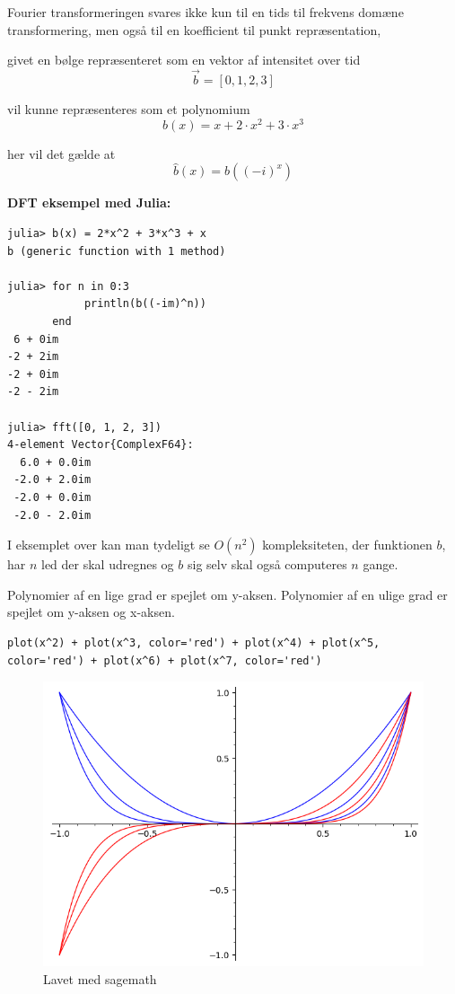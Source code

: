 \documentclass[11pt,a4paper]{article}
\begin{document}
Fourier transformeringen svares ikke kun til en tids til frekvens domæne transformering,
men også til en koefficient til punkt repræsentation,

givet en bølge repræsenteret som en vektor af intensitet over tid
$$
\vec{b} = [0, 1, 2, 3]
$$

vil kunne repræsenteres som et polynomium
$$
b(x) = x + 2\cdot x^2 + 3\cdot x^3
$$

her vil det gælde at
$$
\hat{b}(x) = b((-i)^x)
$$

\textbf{DFT eksempel med Julia:}
\begin{verbatim}
julia> b(x) = 2*x^2 + 3*x^3 + x
b (generic function with 1 method)

julia> for n in 0:3
            println(b((-im)^n))
       end
 6 + 0im
-2 + 2im
-2 + 0im
-2 - 2im

julia> fft([0, 1, 2, 3])
4-element Vector{ComplexF64}:
  6.0 + 0.0im
 -2.0 + 2.0im
 -2.0 + 0.0im
 -2.0 - 2.0im
\end{verbatim}

I eksemplet over kan man tydeligt se \(O(n^2)\) kompleksiteten,
der funktionen \(b\), har \(n\) led der skal udregnes
og \(b\) sig selv skal også computeres \(n\) gange.

Polynomier af en lige grad er spejlet om y-aksen.
Polynomier af en ulige grad er spejlet om y-aksen og x-aksen.

\begin{verbatim}
plot(x^2) + plot(x^3, color='red') + plot(x^4) + plot(x^5, color='red') + plot(x^6) + plot(x^7, color='red')
\end{verbatim}

\begin{figure}[htbp]
\centering
\includegraphics[width=.9\linewidth]{even_and_odd.png}
\caption{Lavet med sagemath}
\end{figure}
\end{document}
